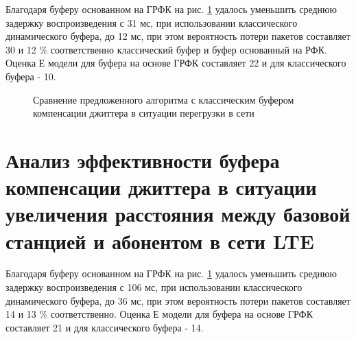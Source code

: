 Благодаря буферу основанном на ГРФК на рис. \ref{img4:congBuff} удалось уменьшить среднюю задержку воспроизведения с 31 мс, при использовании классического динамического буфера, до 12 мс, при этом вероятность потери пакетов составляет 30 и 12 \% соответственно классический буфер и буфер основанный на РФК. Оценка Е модели для буфера на основе ГРФК составляет 22 и для классического буфера - 10.


\pgfplotsset{width=15cm, height=10cm, compat=1.3}
\begin{figure} [h]
  \center
{}
\caption{Сравнение предложенного алгоритма с классическим буфером компенсации джиттера в ситуации перегрузки в сети}
  \label{img4:congBuff}
\end{figure}














\section{Анализ эффективности буфера компенсации джиттера в ситуации увеличения расстояния между базовой станцией и абонентом в сети LTE} \label{sect4}



Благодаря буферу основанном на ГРФК на рис. \ref{img4:congBuff} удалось уменьшить среднюю задержку воспроизведения с 106 мс, при использовании классического динамического буфера, до 36 мс, при этом вероятность потери пакетов составляет 14 и 13 \% соответственно. Оценка Е модели для буфера на основе ГРФК составляет 21 и для классического буфера - 14.



